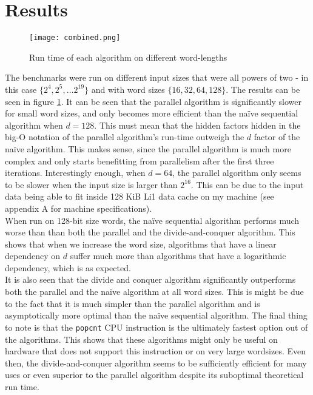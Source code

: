\section{Results}
\begin{figure}
    \centering
    \texttt{[image: combined.png]}
    \caption{Run time of each algorithm on different word-lengths}
    \label{fig:runtime}
\end{figure}
The benchmarks were run on different input sizes that were all powers of two - in this case $\{2^4, 2^5, \dots 2^{19}\}$ and with word sizes $\{16, 32, 64, 128\}$. The results can be seen in figure \ref{fig:runtime}. 
It can be seen that the parallel algorithm is significantly slower for small word sizes, and only becomes more efficient than the naïve sequential algorithm when $d=128$. This must mean that the hidden factors hidden in the big-O notation of the parallel algorithm's run-time outweigh the $d$ factor of the naïve algorithm. This makes sense, since the parallel algorithm is much more complex and only starts benefitting from parallelism after the first three iterations. Interestingly enough, when $d=64$, the parallel algorithm only seems to be slower when the input size is larger than $2^{16}$. This can be due to the input data being able to fit inside 128 KiB Li1 data cache on my machine (see appendix A for machine specifications).\\
When run on 128-bit size words, the naïve sequential algorithm performs much worse than than both the parallel and the divide-and-conquer algorithm. This shows that when we increase the word size, algorithms that have a linear dependency on $d$ suffer much more than algorithms that have a logarithmic dependency, which is as expected.\\
It is also seen that the divide and conquer algorithm significantly outperforms both the parallel and the naïve algorithm at all word sizes. This is might be due to the fact that it is much simpler than the parallel algorithm and is asymptotically more optimal than the naïve sequential algorithm.
The final thing to note is that the \texttt{popcnt} CPU instruction is the ultimately fastest option out of the algorithms. This shows that these algorithms might only be useful on hardware that does not support this instruction or on very large wordsizes. Even then, the divide-and-conquer algorithm seems to be sufficiently efficient for many uses or even superior to the parallel algorithm despite its suboptimal theoretical run time.\\

